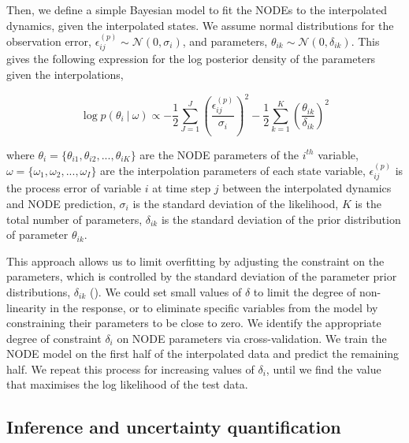 \documentclass[11pt, oneside]{article}
\begin{document}
Then, we define a simple Bayesian model to fit the NODEs to the interpolated dynamics, given the interpolated states.
We assume normal distributions for the observation error, $\epsilon^{(p)}_{ij} \sim \mathcal{N}(0,\sigma_i)$, and parameters, $\theta_{ik} \sim \mathcal{N}(0,\delta_{ik})$.
This gives the following expression for the log posterior density of the parameters given the interpolations,

\vspace{-0.5cm}
\begin{equation}
    \log p(\theta_i ~|~ \omega) \propto - \frac{1}{2} \sum_{J=1}^{J} \left( \frac{\epsilon^{(p)}_{ij}}{\sigma_i} \right)^2 - \frac{1}{2} \sum_{k=1}^{K} \left( \frac{\theta_{ik}}{\delta_{ik}} \right)^2
\end{equation}

where $\theta_i = \{\theta_{i1},\theta_{i2},...,\theta_{iK}\}$ are the NODE parameters of the $i^{th}$ variable,
$\omega = \{\omega_1,\omega_2,...,\omega_I\}$ are the interpolation parameters of each state variable, 
$\epsilon^{(p)}_{ij}$ is the process error of variable $i$ at time step $j$ between the interpolated dynamics and NODE prediction, 
$\sigma_i$ is the standard deviation of the likelihood, 
$K$ is the total number of parameters, 
$\delta_{ik}$ is the standard deviation of the prior distribution of parameter $\theta_{ik}$.

This approach allows us to limit overfitting by adjusting the constraint on the parameters, which is controlled by the standard deviation of the parameter prior distributions, $\delta_{ik}$ (\cite{Cawley2007, Bonnaffe2021a}).
We could set small values of $\delta$ to limit the degree of non-linearity in the response, or to eliminate specific variables from the model by constraining their parameters to be close to zero.
We identify the appropriate degree of constraint $\delta_{i}$ on NODE parameters via cross-validation. 
We train the NODE model on the first half of the interpolated data and predict the remaining half.
We repeat this process for increasing values of $\delta_{i}$, until we find the value that maximises the log likelihood of the test data.

\subsection{Inference and uncertainty quantification}
\end{document}
